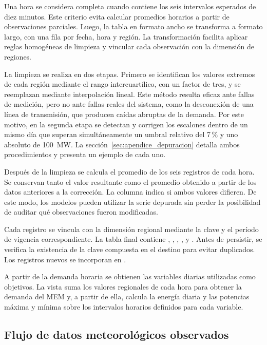 Una hora se considera completa cuando contiene los seis intervalos esperados de diez minutos. Este criterio evita calcular promedios horarios a partir de observaciones parciales. Luego, la tabla en formato ancho se transforma a formato largo, con una fila por fecha, hora y región. La transformación facilita aplicar reglas homogéneas de limpieza y vincular cada observación con la dimensión de regiones.

La limpieza se realiza en dos etapas. Primero se identifican los valores extremos de cada región mediante el rango intercuartílico, con un factor de tres, y se reemplazan mediante interpolación lineal. Este método resulta eficaz ante fallas de medición, pero no ante fallas reales del sistema, como la desconexión de una línea de transmisión, que producen caídas abruptas de la demanda. Por este motivo, en la segunda etapa se detectan y corrigen los escalones dentro de un mismo día que superan simultáneamente un umbral relativo del 7\,\% y uno absoluto de 100~MW. La sección~\ref{sec:apendice_depuracion} detalla ambos procedimientos y presenta un ejemplo de cada uno.

Después de la limpieza se calcula el promedio de los seis registros de cada hora. Se conservan tanto el valor resultante como el promedio obtenido a partir de los datos anteriores a la corrección. La columna  indica si ambos valores difieren. De este modo, los modelos pueden utilizar la serie depurada sin perder la posibilidad de auditar qué observaciones fueron modificadas.

Cada registro se vincula con la dimensión regional mediante la clave  y el período de vigencia correspondiente. La tabla final contiene , , , ,  y . Antes de persistir, se verifica la existencia de la clave compuesta en el destino para evitar duplicados. Los registros nuevos se incorporan en .

A partir de la demanda horaria se obtienen las variables diarias utilizadas como objetivos. La vista  suma los valores regionales de cada hora para obtener la demanda del MEM y, a partir de ella, calcula la energía diaria y las potencias máxima y mínima sobre los intervalos horarios definidos para cada variable.

\subsection{Flujo de datos meteorológicos observados}
\label{subsec:pipeline_meteorologico}

